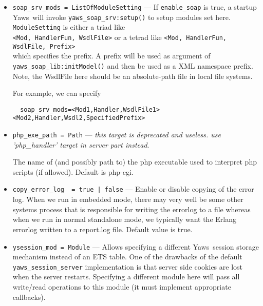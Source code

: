 \documentclass[11pt,oneside,english]{book}
\newcommand{\Yaws}            %
        {{\sc Yaws}}
\begin{document}
\begin{itemize}
\item        \verb+soap_srv_mods = ListOfModuleSetting+ ---
              If \verb+enable_soap+ is true, a startup \Yaws\ will invoke
              \verb+yaws_soap_srv:setup()+ to setup modules set
              here. \verb+ModuleSetting+ is either a triad like\\
              \verb+<Mod, HandlerFun, WsdlFile>+ or a tetrad like
              \verb+<Mod, HandlerFun, WsdlFile, Prefix>+\\ which specifies the
              prefix. A prefix will be used as argument of
              \verb+yaws_soap_lib:initModel()+ and then be used as a XML
              namespace prefix.  Note, the WsdlFile here should be an
              absolute-path file in local file systems.

              For example, we can specify
\begin{verbatim}
  soap_srv_mods=<Mod1,Handler,WsdlFile1> <Mod2,Handler,Wsdl2,SpecifiedPrefix>
\end{verbatim}

\item        \verb+php_exe_path = Path+ ---
              \textit{this target is deprecated and useless. use 'php\_handler'
                target in server part instead}.

              The name of (and possibly path to) the php executable used to
              interpret php scripts (if allowed).  Default is php-cgi.

\item        \verb+copy_error_log  = true | false+ ---
              Enable or disable copying of the error log. When we run in
              embedded mode, there may very well be some other systems process
              that is responsible for writing the errorlog to a file whereas
              when we run in normal standalone mode, we typically want the
              Erlang errorlog written to a report.log file.  Default value is
              true.

\item        \verb+ysession_mod = Module+ ---
               Allows specifying a different \Yaws\ session storage mechanism
               instead of an ETS table. One of the drawbacks of the default
               \verb+yaws_session_server+ implementation is that server side
               cookies are lost when the server restarts. Specifying a different
               module here will pass all write/read operations to this module
               (it must implement appropriate callbacks).


\end{itemize}
\end{document}
